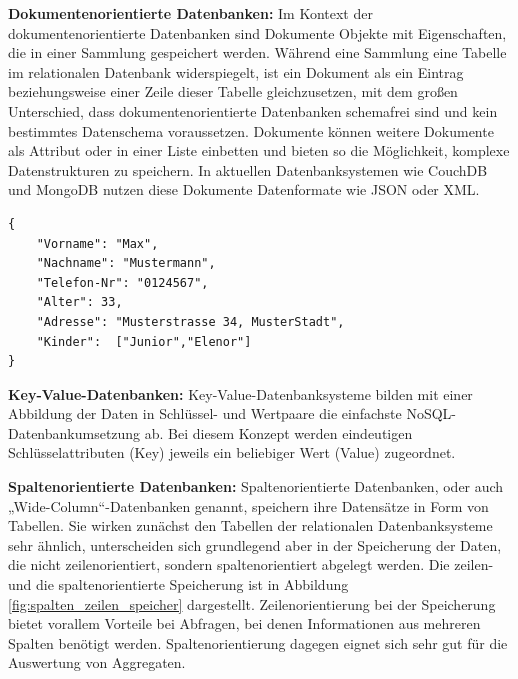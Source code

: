 \noindent
{}
\textbf{Dokumentenorientierte Datenbanken:}
Im Kontext der dokumentenorientierte Datenbanken sind Dokumente Objekte mit Eigenschaften, die in einer Sammlung gespeichert werden. 
Während eine Sammlung eine Tabelle im relationalen Datenbank widerspiegelt, ist ein Dokument als ein Eintrag beziehungsweise einer Zeile dieser Tabelle gleichzusetzen, mit dem großen Unterschied, dass dokumentenorientierte Datenbanken schemafrei sind und kein bestimmtes Datenschema voraussetzen. 
Dokumente können weitere Dokumente als Attribut oder in einer Liste einbetten und bieten so die Möglichkeit, komplexe Datenstrukturen zu speichern.  
In aktuellen Datenbanksystemen wie CouchDB und MongoDB nutzen diese Dokumente Datenformate wie JSON oder XML.\\

\begin{lstlisting}
{
	"Vorname": "Max",
	"Nachname": "Mustermann",
	"Telefon-Nr": "0124567",
	"Alter": 33,
	"Adresse": "Musterstrasse 34, MusterStadt",
	"Kinder":  ["Junior","Elenor"]
}
\end{lstlisting}

\noindent
{}
\textbf{Key-Value-Datenbanken:}
Key-Value-Datenbanksysteme bilden mit einer Abbildung der Daten in Schlüssel- und Wertpaare die einfachste NoSQL-Datenbankumsetzung ab. Bei diesem Konzept werden eindeutigen Schlüsselattributen (Key) jeweils ein beliebiger Wert (Value) zugeordnet. %

%    
%
%
%
%
%

\noindent
{}
\textbf{Spaltenorientierte Datenbanken:}
Spaltenorientierte Datenbanken, oder auch „Wide-Column“-Datenbanken genannt, speichern ihre Datensätze in Form von Tabellen.  Sie wirken zunächst den Tabellen der relationalen Datenbanksysteme sehr ähnlich, unterscheiden sich grundlegend aber in der Speicherung der Daten, die nicht zeilenorientiert, sondern spaltenorientiert abgelegt werden. 
Die zeilen- und die spaltenorientierte Speicherung ist in Abbildung \ref{fig:spalten_zeilen_speicher} dargestellt. Zeilenorientierung bei der Speicherung bietet vorallem Vorteile bei Abfragen, bei denen Informationen aus mehreren Spalten benötigt werden.
Spaltenorientierung dagegen eignet sich sehr gut für die Auswertung von Aggregaten.
\newline

